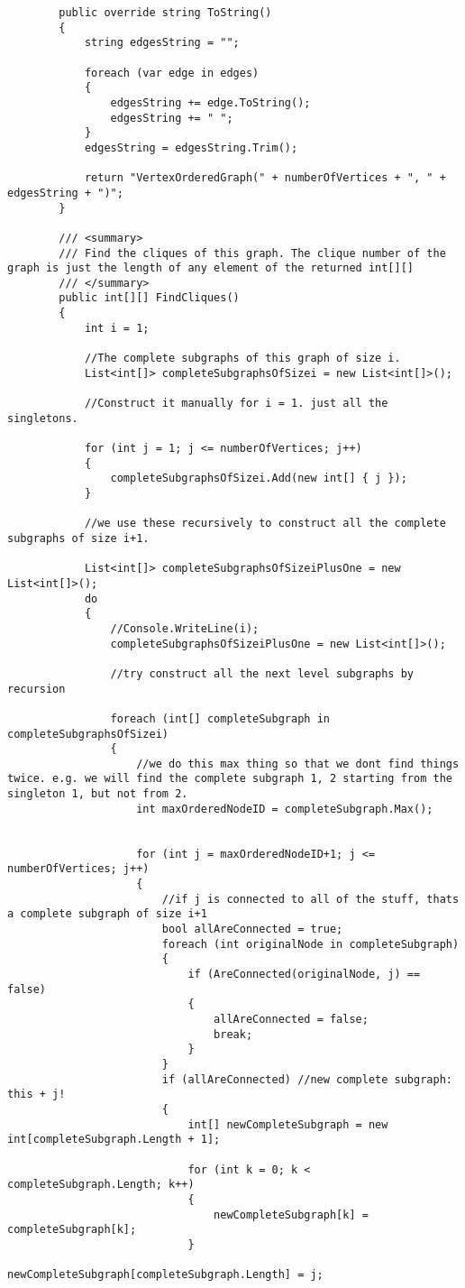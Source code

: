 \documentclass{article}
\begin{document}
\begin{lstlisting}
		public override string ToString()
		{
			string edgesString = "";
			
			foreach (var edge in edges)
			{
				edgesString += edge.ToString();
				edgesString += " ";
			}
			edgesString = edgesString.Trim();
			
			return "VertexOrderedGraph(" + numberOfVertices + ", " + edgesString + ")";
		}
		
		/// <summary>
		/// Find the cliques of this graph. The clique number of the graph is just the length of any element of the returned int[][]
		/// </summary>
		public int[][] FindCliques()
		{
			int i = 1;
			
			//The complete subgraphs of this graph of size i.
			List<int[]> completeSubgraphsOfSizei = new List<int[]>();
			
			//Construct it manually for i = 1. just all the singletons.
			
			for (int j = 1; j <= numberOfVertices; j++)
			{
				completeSubgraphsOfSizei.Add(new int[] { j });
			}
			
			//we use these recursively to construct all the complete subgraphs of size i+1.
			
			List<int[]> completeSubgraphsOfSizeiPlusOne = new List<int[]>();
			do
			{
				//Console.WriteLine(i);
				completeSubgraphsOfSizeiPlusOne = new List<int[]>();
				
				//try construct all the next level subgraphs by recursion
				
				foreach (int[] completeSubgraph in completeSubgraphsOfSizei)
				{
					//we do this max thing so that we dont find things twice. e.g. we will find the complete subgraph 1, 2 starting from the singleton 1, but not from 2.
					int maxOrderedNodeID = completeSubgraph.Max();
					
					
					for (int j = maxOrderedNodeID+1; j <= numberOfVertices; j++)
					{
						//if j is connected to all of the stuff, thats a complete subgraph of size i+1
						bool allAreConnected = true;
						foreach (int originalNode in completeSubgraph)
						{
							if (AreConnected(originalNode, j) == false)
							{
								allAreConnected = false;
								break;
							}
						}
						if (allAreConnected) //new complete subgraph: this + j!
						{
							int[] newCompleteSubgraph = new int[completeSubgraph.Length + 1];
							
							for (int k = 0; k < completeSubgraph.Length; k++)
							{
								newCompleteSubgraph[k] = completeSubgraph[k];
							}
							newCompleteSubgraph[completeSubgraph.Length] = j;
							

\end{lstlisting}
\end{document}
